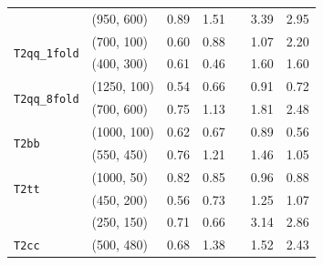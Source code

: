 \begin{table}[!t]
\begin{tabular}{ llccccc }
                                            & (950, 600)    & 0.89 & 1.51 &  & 3.39 & 2.95 \\ [0.5ex]
    \multirow{2}{*}{\texttt{T2qq\_1fold}}   & (700, 100)    & 0.60 & 0.88 &  & 1.07 & 2.20 \\
                                            & (400, 300)    & 0.61 & 0.46 &  & 1.60 & 1.60 \\ [0.5ex]
    \multirow{2}{*}{\texttt{T2qq\_8fold}}   & (1250, 100)   & 0.54 & 0.66 &  & 0.91 & 0.72 \\
                                            & (700, 600)    & 0.75 & 1.13 &  & 1.81 & 2.48 \\ [0.5ex]
    \multirow{2}{*}{\texttt{T2bb}}          & (1000, 100)   & 0.62 & 0.67 &  & 0.89 & 0.56 \\
                                            & (550, 450)    & 0.76 & 1.21 &  & 1.46 & 1.05 \\ [0.5ex]
    \multirow{2}{*}{\texttt{T2tt}}          & (1000, 50)    & 0.82 & 0.85 &  & 0.96 & 0.88 \\
                                            & (450, 200)    & 0.56 & 0.73 &  & 1.25 & 1.07 \\ 
                                            & (250, 150)    & 0.71 & 0.66 &  & 3.14 & 2.86 \\ [0.5ex]
    \multirow{1}{*}{\texttt{T2cc}}          & (500, 480)    & 0.68 & 1.38 &  & 1.52 & 2.43 \\ [0.5ex]
    \hline
  \end{tabular}
\end{table}


